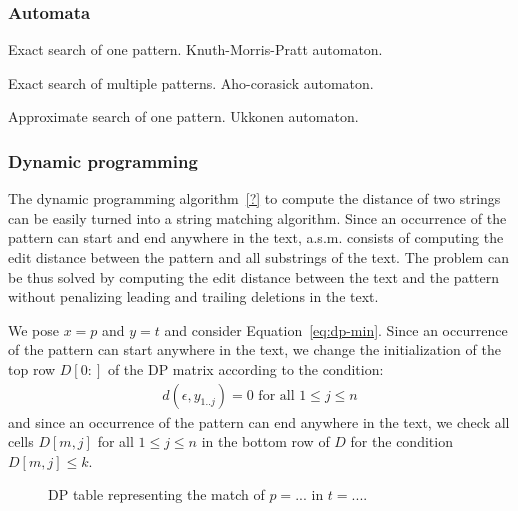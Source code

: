 \subsubsection{Automata}

Exact search of one pattern. Knuth-Morris-Pratt automaton.

Exact search of multiple patterns. Aho-corasick automaton.

Approximate search of one pattern. Ukkonen automaton.

\subsubsection{Dynamic programming}

The dynamic programming algorithm~\ref{?} to compute the distance of two strings can be easily turned into a string matching algorithm.
Since an occurrence of the pattern can start and end anywhere in the text, a.s.m. consists of computing the edit distance between the pattern and all substrings of the text.
The problem can be thus solved by computing the edit distance between the text and the pattern without penalizing leading and trailing deletions in the text.

We pose $x=p$ and $y=t$ and consider Equation~\ref{eq:dp-min}.
Since an occurrence of the pattern can start anywhere in the text, we change the initialization of the top row $D[0:]$ of the DP matrix according to the condition:
\begin{eqnarray}
d(\epsilon, y_{1..j}) = 0 \text{ for all } 1 \leq j \leq n
\end{eqnarray}
and since an occurrence of the pattern can end anywhere in the text, we check all cells $D[m,j]$ for all $1 \leq j \leq n$ in the bottom row of $D$ for the condition $D[m,j] \leq k$.

\begin{figure}[h]
\begin{center}
\caption[Example of approximate string matching via DP.]{DP table representing the match of $p=...$ in $t=...$.}
\label{fig:asm-dp}

\end{center}
\end{figure}





